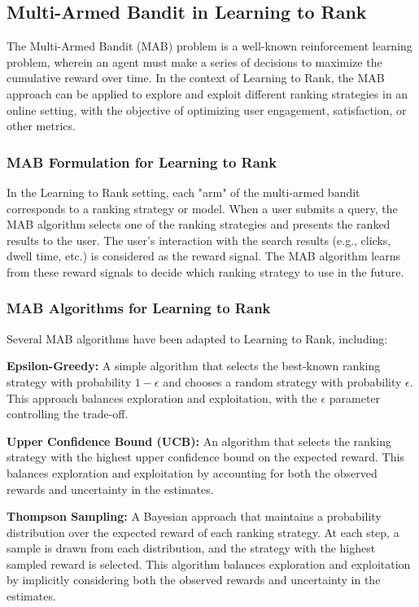 \documentclass[12pt]{article}
\begin{document}
\subsection{Multi-Armed Bandit in Learning to Rank}

The Multi-Armed Bandit (MAB) problem is a well-known reinforcement learning problem, wherein an agent must make a series of decisions to maximize the cumulative reward over time. In the context of Learning to Rank, the MAB approach can be applied to explore and exploit different ranking strategies in an online setting, with the objective of optimizing user engagement, satisfaction, or other metrics.

\subsubsection{MAB Formulation for Learning to Rank}

In the Learning to Rank setting, each "arm" of the multi-armed bandit corresponds to a ranking strategy or model. When a user submits a query, the MAB algorithm selects one of the ranking strategies and presents the ranked results to the user. The user's interaction with the search results (e.g., clicks, dwell time, etc.) is considered as the reward signal. The MAB algorithm learns from these reward signals to decide which ranking strategy to use in the future.

\subsubsection{MAB Algorithms for Learning to Rank}

Several MAB algorithms have been adapted to Learning to Rank, including:

\textbf{Epsilon-Greedy:} A simple algorithm that selects the best-known ranking strategy with probability $1 - \epsilon$ and chooses a random strategy with probability $\epsilon$. This approach balances exploration and exploitation, with the $\epsilon$ parameter controlling the trade-off.

\textbf{Upper Confidence Bound (UCB):} An algorithm that selects the ranking strategy with the highest upper confidence bound on the expected reward. This balances exploration and exploitation by accounting for both the observed rewards and uncertainty in the estimates.

\textbf{Thompson Sampling:} A Bayesian approach that maintains a probability distribution over the expected reward of each ranking strategy. At each step, a sample is drawn from each distribution, and the strategy with the highest sampled reward is selected. This algorithm balances exploration and exploitation by implicitly considering both the observed rewards and uncertainty in the estimates.
\end{document}
